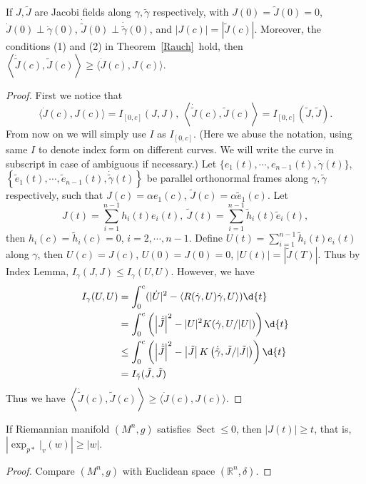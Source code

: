 \begin{lem}\label{compare jacobi fields}
    If $J,\tilde{J}$ are Jacobi fields along $\gamma,\tilde{\gamma}$ respectively, with $J(0)=\tilde{J}(0)=0$, $\dot{J}(0)\perp\dot{\gamma}(0)$, $\dot{\tilde{J}}(0)\perp\dot{\tilde{\gamma}}(0)$, and $|J(c)|=|\tilde{J}(c)|$.
    Moreover, the conditions (1) and (2) in Theorem~\ref{Rauch}~hold, then $\left\langle\dot{\tilde{J}}(c),\tilde{J}(c)\right\rangle\geq\langle\dot{J}(c),J(c)\rangle$.
\end{lem}
\begin{proof}
    First we notice that
    \[\langle\dot{J}(c),J(c)\rangle=I_{[0,c]}(J,J),\ \left\langle\dot{\tilde{J}}(c),\tilde{J}(c)\right\rangle=I_{[0,c]}\left(\tilde{J},\tilde{J}\right).\]
    From now on we will simply use $I$ as $I_{[0,c]}$.
    (Here we abuse the notation, using same $I$ to denote index form on different curves.
    We will write the curve in subscript in case of ambiguous if necessary.)
    Let $\{e_1(t),\cdots,e_{n-1}(t),\dot{\gamma}(t)\}$, $\left\{\tilde{e}_1(t),\cdots,\tilde{e}_{n-1}(t),\dot{\tilde{\gamma}}(t)\right\}$ be parallel orthonormal frames along $\gamma,\tilde{\gamma}$ respectively, such that $J(c)=\alpha e_1(c)$, $\tilde{J}(c)=\alpha\tilde{e}_1(c)$.
    Let
    \[J(t)=\sum_{i=1}^{n-1}h_i(t)e_i(t),\ \tilde{J}(t)=\sum_{i=1}^{n-1}\tilde{h}_i(t)\tilde{e}_i(t),\]
    then $h_i(c)=\tilde{h}_i(c)=0$, $i=2,\cdots,n-1$.
    Define $U(t)=\sum_{i=1}^{n-1}\tilde{h}_i(t)e_i(t)$ along $\gamma$, then $U(c)=J(c)$, $U(0)=J(0)=0$, $|U(t)|=|\tilde{J}(T)|$.
    Thus by Index Lemma, $I_\gamma(J,J)\leq I_\gamma(U,U)$.
    However, we have
    \begin{align*}
        I_\gamma(U,U)&=\int_0^c(|\dot{U}|^2-\langle R(\dot{\gamma},U)\dot{\gamma},U\rangle)\d{t}\\
        &=\int_0^c\left(\left|\dot{\tilde{J}}\right|^2-|U|^2K(\dot{\gamma},U/|U|)\right)\d{t}\\
        &\leq\int_0^c\left(\left|\dot{\tilde{J}}\right|^2-\left|\tilde{J}\right|K\left(\dot{\tilde{\gamma}},\tilde{J}/|\tilde{J}|\right)\right)\d{t}\\
        &=I_{\tilde{\gamma}}(\tilde{J},\tilde{J})
    \end{align*}
    Thus we have $\left\langle\dot{\tilde{J}}(c),\tilde{J}(c)\right\rangle\geq\langle\dot{J}(c),J(c)\rangle$.
\end{proof}

\begin{cor}
    If Riemannian manifold $(M^n,g)$ satisfies $\operatorname{Sect}\leq 0$, then $|J(t)|\geq t$, that is, $\left|\exp_{p*}|_v(w)\right|\geq|w|$.
\end{cor}
\begin{proof}
    Compare $(M^n,g)$ with Euclidean space $(\mathbb{R}^n,\delta)$.
\end{proof}

